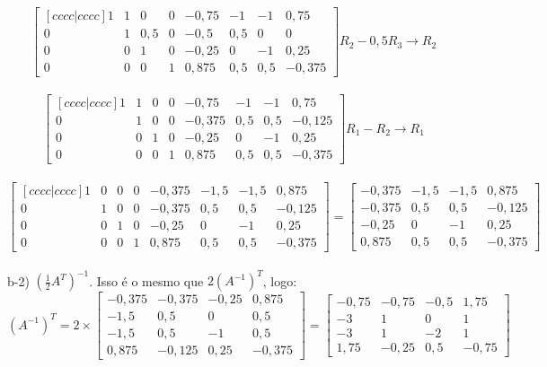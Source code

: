\\
\[
    \begin{bmatrix}[cccc|cccc]
        1 & 1 & 0   & 0 & -0,75 & -1  & -1  & 0,75   \\
        0 & 1 & 0,5 & 0 & -0,5  & 0,5 & 0   & 0      \\
        0 & 0 & 1   & 0 & -0,25 & 0   & -1  & 0,25   \\
        0 & 0 & 0   & 1 & 0,875 & 0,5 & 0,5 & -0,375
    \end{bmatrix}
    R_2 - 0,5R_3\to R_2
\]
\\
\[
    \begin{bmatrix}[cccc|cccc]
        1 & 1 & 0 & 0 & -0,75  & -1  & -1  & 0,75   \\
        0 & 1 & 0 & 0 & -0,375 & 0,5 & 0,5 & -0,125 \\
        0 & 0 & 1 & 0 & -0,25  & 0   & -1  & 0,25   \\
        0 & 0 & 0 & 1 & 0,875  & 0,5 & 0,5 & -0,375
    \end{bmatrix}
    R_1 - R_2\to R_1
\]
\\
\begin{equation}
    \begin{bmatrix}[cccc|cccc]
        1 & 0 & 0 & 0 & -0,375 & -1,5 & -1,5 & 0,875  \\
        0 & 1 & 0 & 0 & -0,375 & 0,5  & 0,5  & -0,125 \\
        0 & 0 & 1 & 0 & -0,25  & 0    & -1   & 0,25   \\
        0 & 0 & 0 & 1 & 0,875  & 0,5  & 0,5  & -0,375
    \end{bmatrix} =
    \begin{bmatrix}
        -0,375 & -1,5 & -1,5 & 0,875  \\
        -0,375 & 0,5  & 0,5  & -0,125 \\
        -0,25  & 0    & -1   & 0,25   \\
        0,875  & 0,5  & 0,5  & -0,375
    \end{bmatrix}
\end{equation}
\\

b-2) $(\frac{1}{2}A^T)^{-1}$. Isso é o mesmo que $2(A^{-1})^{T}$, logo:
\\

\begin{equation}
    (A^{-1})^T= 2\times
    \begin{bmatrix}
        -0,375 & -0,375 & -0,25 & 0,875  \\
        -1,5   & 0,5    & 0     & 0,5    \\
        -1,5   & 0,5    & -1    & 0,5    \\
        0,875  & -0,125 & 0,25  & -0,375
    \end{bmatrix} =
    \begin{bmatrix}
        -0,75 & -0,75 & -0,5 & 1,75  \\
        -3    & 1     & 0    & 1     \\
        -3    & 1     & -2   & 1     \\
        1,75  & -0,25 & 0,5  & -0,75
    \end{bmatrix}
\end{equation}
